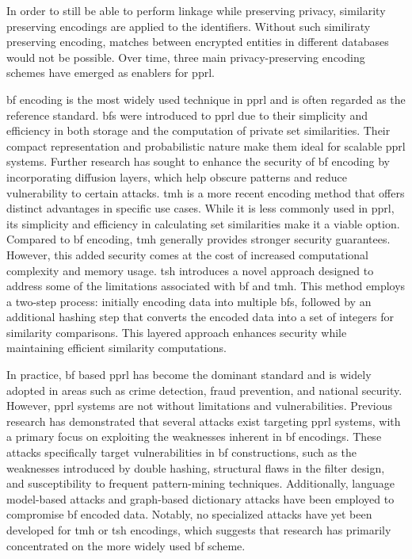 In order to still be able to perform linkage while preserving privacy, similarity preserving encodings are applied to the identifiers.
Without such similiraty preserving encoding, matches between encrypted entities in different databases would not be possible.
Over time, three main privacy-preserving encoding schemes have emerged as enablers for \ac{pprl}. \cite{vidanage2020graph, schaefer2024}

\ac{bf} encoding is the most widely used technique in \ac{pprl} and is often regarded as the reference standard. 
\ac{bf}s were introduced to \ac{pprl} due to their simplicity and efficiency in both storage and the computation of private set similarities. 
Their compact representation and probabilistic nature make them ideal for scalable \ac{pprl} systems.
Further research has sought to enhance the security of \ac{bf} encoding by incorporating diffusion layers, which help obscure patterns and reduce vulnerability to certain attacks. %
\ac{tmh} is a more recent encoding method that offers distinct advantages in specific use cases. 
While it is less commonly used in \ac{pprl}, its simplicity and efficiency in calculating set similarities make it a viable option. 
Compared to \ac{bf} encoding, \ac{tmh} generally provides stronger security guarantees. 
However, this added security comes at the cost of increased computational complexity and memory usage.
\ac{tsh} introduces a novel approach designed to address some of the limitations associated with \ac{bf} and \ac{tmh}. 
This method employs a two-step process: initially encoding data into multiple \ac{bf}s, followed by an additional hashing step that converts the encoded data into a set of integers for similarity comparisons. 
This layered approach enhances security while maintaining efficient similarity computations. \cite{vidanage2020graph, schaefer2024}

In practice, \ac{bf} based \ac{pprl} has become the dominant standard and is widely adopted in areas such as crime detection, fraud prevention, and national security. 
However, \ac{pprl} systems are not without limitations and vulnerabilities. 
Previous research has demonstrated that several attacks exist targeting \ac{pprl} systems, with a primary focus on exploiting the weaknesses inherent in \ac{bf} encodings.
These attacks specifically target vulnerabilities in \ac{bf} constructions, such as the weaknesses introduced by double hashing, structural flaws in the filter design, and susceptibility to frequent pattern-mining techniques. 
Additionally, language model-based attacks and graph-based dictionary attacks have been employed to compromise \ac{bf} encoded data. 
Notably, no specialized attacks have yet been developed for \ac{tmh} or \ac{tsh} encodings, which suggests that research has primarily concentrated on the more widely used \ac{bf} scheme. \cite{vidanage2020graph}

